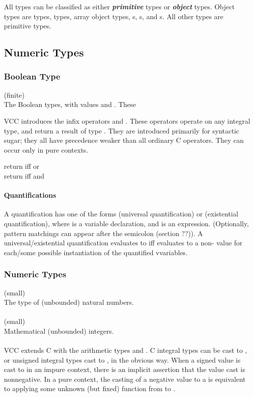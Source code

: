\documentclass[preprint,nocopyrightspace]{sigplanconf}
\newcommand{\subsubsubsection}[1]{\paragraph{#1}}
\newcommand{\Def}[1]{\textit{\textbf{#1}}}
\begin{document}
{All types can be classified as either \Def{primitive} types
or \Def{object} types. Object types are 
types,  types, array object types, \vcc{\thread}s, 
\vcc{\claim}s, and \vcc{\blob}s. All other types are primitive types.

\subsection{Numeric Types}

\subsubsection{Boolean Type}

\vcc{\bool} (finite)\\
The Boolean types, with values \vcc{\true} and \vcc{\false}. These 

VCC introduces the infix operators \vcc{==>}
and \vcc{<==>}. These operators operate on any integral type, and
return a result of type \vcc{\bool}. They are introduced primarily
for syntactic sugar; they all have precedence weaker than all ordinary
C operators. They can occur only in pure contexts.

 return \vcc{\true} iff  or \\
 return \vcc{\true} iff  and \\

\subsubsubsection{Quantifications}

A quantification has one of the forms
 (universal quantification) or 
 (existential quantification), 
where  is a variable declaration, and 
is an expression. (Optionally, pattern matchings can appear after the
semicolon (section ??)). A universal/existential quantification evaluates
to \vcc{\true} iff  evaluates to a non-\vcc{\false} value for
each/some possible instantiation of the quantified vvariables.

\subsubsection{Numeric Types}

\vcc{\natural} (small)\\
The type of (unbounded) natural numbers. 
\\\\
\vcc{\integer} (small)\\
Mathematical (unbounded) integers. 
\\\\
VCC extends C with the arithmetic types \vcc{\natural}
and \vcc{\integer}. C integral types can be cast to \vcc{\integer},
or unsigned integral types cast to \vcc{\natural}, in the obvious
way. When a signed value is cast to \vcc{\natural} in an impure
context, there is an implicit assertion that the value cast is
nonnegative. In a pure context, the casting of a negative value to 
a \vcc{\natural} is equivalent to applying some unknown (but fixed)
function from  to . 

}
\end{document}
